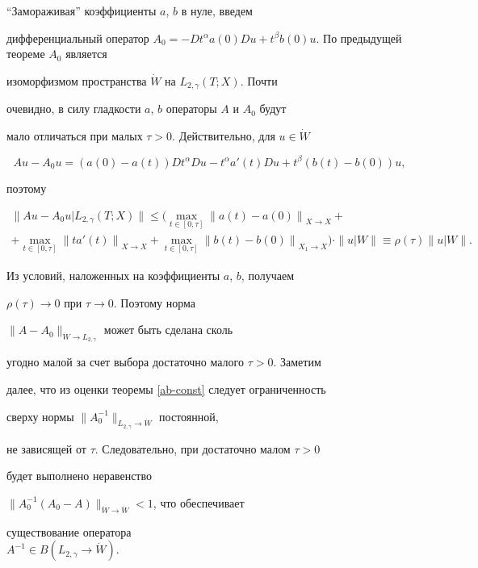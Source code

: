 \begin{pf}


``Замораживая'' коэффициенты $a$, $b$ в нуле, введем


дифференциальный оператор $A_0=-Dt^\alpha


a(0)Du+t^\beta b(0)u$. По предыдущей теореме $A_0$ является


изоморфизмом пространства $\Dot{W}$ на $L_{2,\gamma}(T;X)$. Почти


очевидно, в силу гладкости $a$, $b$ операторы $A$ и $A_0$ будут


мало отличаться при малых $\tau >0$. Действительно, для $u \in \Dot{W}$


$$


Au-A_0u=(a(0)-a(t))Dt^\alpha Du -t^\alpha a'(t) Du + t^\beta


(b(t)-b(0))u,


$$


поэтому


\begin{multline*}


\| Au-A_0u|L_{2,\gamma}(T;X)\| \le ( \max_{t \in [0,\tau]}


{\|a(t)-a(0)\|}_{X \to X} + \\ +\max_{t \in [0,\tau]}


{\|ta'(t)\|}_{X \to X} + \max_{t \in [0,\tau]}


{\|b(t)-b(0)\|}_{X_1 \to X}  ) \cdot \|u|W\| \equiv \rho(\tau)


\|u|W\|.


\end{multline*}


Из условий, наложенных на коэффициенты $a$, $b$,  получаем


$\rho(\tau) \to 0$ при $\tau \to 0$. Поэтому норма


$\|A-A_0\|_{\Dot{W} \to L_{2,\gamma}}$ может быть сделана сколь


угодно малой за счет выбора достаточно малого $\tau > 0$. Заметим


далее, что из оценки теоремы \ref{ab-const} следует ограниченность


сверху нормы $\|A_0^{-1}\|_{L_{2,\gamma} \to \Dot{W}}$ постоянной,


не зависящей от $\tau$. Следовательно, при достаточно малом $\tau> 0$


будет выполнено неравенство


$\|A_0^{-1}(A_0-A)\|_{\Dot{W} \to \Dot{W}} < 1$, что обеспечивает


существование оператора\\ $A^{-1} \in B(L_{2,\gamma} \to \Dot{W})$.


\end{pf}








